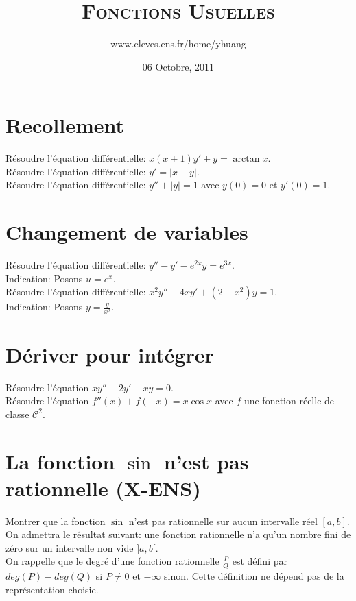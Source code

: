 \documentclass{article}
\begin{document}
\title{\textsc{Fonctions Usuelles}}
\author{www.eleves.ens.fr/home/yhuang}
\date{06 Octobre, 2011}

\maketitle

\section{Recollement}
R\'esoudre l'\'equation diff\'erentielle: $x(x+1)y'+y=\arctan x$.\\
R\'esoudre l'\'equation diff\'erentielle: $y'=|x-y|$.\\
R\'esoudre l'\'equation diff\'erentielle: $y''+|y|=1$ avec $y(0)=0$ et $y'(0)=1$.

\section{Changement de variables}
R\'esoudre l'\'equation diff\'erentielle: $y''-y'-e^{2x}y=e^{3x}$.\\
Indication: Posons $u=e^x$.\\
R\'esoudre l'\'equation diff\'erentielle: $x^2y''+4xy'+(2-x^2)y=1$.\\
Indication: Posons $y=\frac{y}{x^2}$.

\section{D\'eriver pour int\'egrer}
R\'esoudre l'\'equation $xy''-2y'-xy=0$.\\
R\'esoudre l'\'equation $f''(x)+f(-x)=x\cos x$ avec $f$ une fonction r\'eelle de classe $\mathcal{C}^2$.

\section{La fonction $\sin$ n'est pas rationnelle (X-ENS)}
Montrer que la fonction $\sin$ n'est pas rationnelle sur aucun intervalle r\'eel $[a,b]$.\\
On admettra le r\'esultat suivant: une fonction rationnelle n'a qu'un nombre fini de z\'ero sur un intervalle non vide $]a,b[$.\\
On rappelle que le degr\'e d'une fonction rationnelle $\frac{P}{Q}$ est d\'efini par $deg(P)-deg(Q)$ si $P\neq 0$ et $-\infty$ sinon. Cette d\'efinition ne d\'epend pas de la repr\'esentation choisie.
\end{document}

